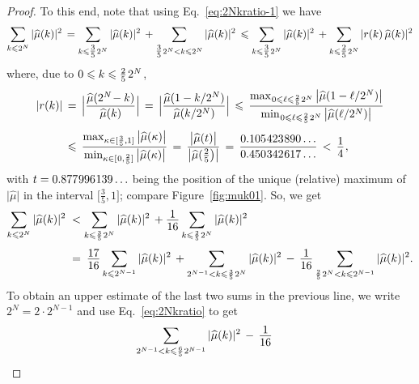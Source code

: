 \documentclass[11pt,a4paper]{amsart}
\theoremstyle{plain}
\theoremstyle{definition}
\numberwithin{equation}{section}
\newcommand{\ts}{\hspace{0.5pt}}
\newcommand{\myfrac}[2]{\frac{\raisebox{-2pt}{$#1$}}
      {\raisebox{0.5pt}{$#2$}}}
\begin{document}
\begin{proof}
To this end, note that using Eq.~\eqref{eq:2Nkratio-1} we have
\[
 \sum_{k\leqslant 2^N}|\widehat{\mu} (k)|^2 
  \,  =\sum_{k\leqslant \tfrac{3}{5}\ts 2^N}|\widehat{\mu} (k)|^2
   \, + \sum_{\tfrac{3}{5}\ts  2^N< k\leqslant 2^N}|\widehat{\mu} (k)|^2
   \, \leqslant \sum_{k\leqslant \tfrac{3}{5}\ts  2^N}
   |\widehat{\mu} (k)|^2 \, + \sum_{k\leqslant \tfrac{2}{5}\ts  2^N}
   | r(k) \, \widehat{\mu} (k) |^2
\]
where, due to $0 \leqslant k \leqslant \frac{2}{5} \ts\ts 2^N$,
\[
\begin{split}
  \lvert r(k) \rvert \, & = \, \Bigl| \frac{\widehat{\mu} 
  (2^N \! - k)} {\widehat{\mu} (k)} \Bigr| \, = \, 
  \Bigl| \frac{\widehat{\mu} (1- k/2^N )}
  {\widehat{\mu} (k/2^N )} \Bigr| \, \leqslant \,
  \frac{\max_{\ts 0 \leqslant \ell \leqslant \frac{2}{5} \ts 2^N} 
         \big|\widehat{\mu} (1-\ell/2^N)\big|}
         {\min_{\ts 0\leqslant \ell \leqslant \frac{2}{5}\ts  2^N} 
         \big|\widehat{\mu} (\ell/2^N )\big|} \\[1mm]
  & \leqslant \, 
  \frac{\max_{\kappa \in [\frac{3}{5} , 1]} 
         \big|\widehat{\mu} (\kappa )\big|}
         {\ts \min_{ \kappa \in [\ts 0, \frac{2}{5}]} 
         \big|\widehat{\mu} (\kappa)\big|}
  \, = \, \frac{ \big\lvert \widehat{\mu} (t) \big\rvert }
        {\big\lvert \widehat{\mu} 
        (\tfrac{2}{5}\bigr) \big\rvert} \, = \,
  \frac{0.105{\ts}423{\ts}890\ldots}{0.450{\ts}342{\ts}617\ldots}
  \, < \, \myfrac{1}{4} \ts ,
\end{split}
\]
with $t=0.877{\ts}996{\ts}139\ldots$ being the position of the unique
(relative) maximum of $\lvert \widehat{\mu} \rvert$ in the interval
$\bigl[ \frac{3}{5}, 1 \bigr]$; compare Figure~\ref{fig:muk01}. So, we
get
\begin{align*}
   \sum_{k\leqslant 2^N}|\widehat{\mu} (k)|^2 \;
    & < \sum_{k\leqslant \frac{3}{5}\ts  2^N}
      |\widehat{\mu} (k)|^2 \, + \myfrac{1}{16}
      \sum_{k\leqslant \frac{2}{5}\ts  2^N}
      |\widehat{\mu} (k)|^2\\[1mm]
    & = \: \myfrac{17}{16}\sum_{k\leqslant 2^{N-1}}
    |\widehat{\mu} (k)|^2 \, +
    \sum_{2^{N-1}<k\leqslant \frac{3}{5}\ts  2^N}
    |\widehat{\mu} (k)|^2 \, - \, \myfrac{1}{16}
    \sum_{\frac{2}{5}\ts  2^N<k\leqslant 2^{N-1}}|\widehat{\mu} (k)|^2.
\end{align*}
To obtain an upper estimate of the last two sums in the previous line,
we write $2^N = 2 \cdot 2^{N-1}$ and use Eq.~\eqref{eq:2Nkratio} to get
\begin{align*}
  \sum_{2^{N-1}<k\leqslant \frac{6}{5}\ts 2^{N-1}}
   |\widehat{\mu} (k)|^2 \, & - \, \myfrac{1}{16}

\end{align*}
\end{proof}
\end{document}
